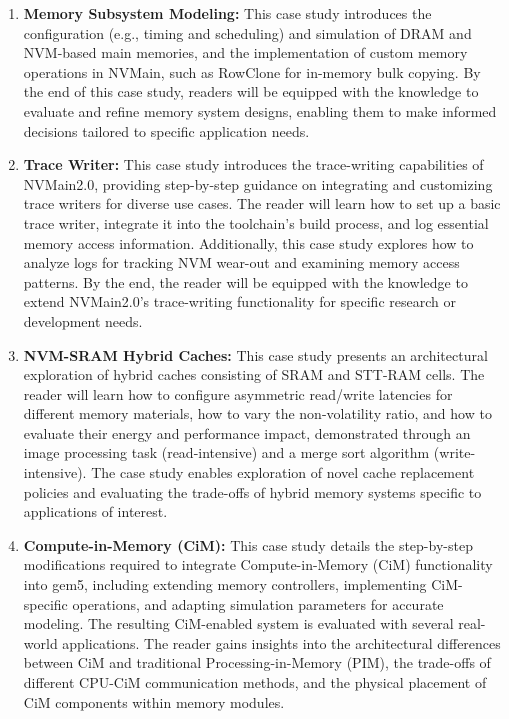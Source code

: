 \documentclass[manuscript,screen]{acmart}
\begin{document}
\begin{enumerate}
    \item \textbf{Memory Subsystem Modeling:} 
     This case study introduces the configuration (e.g., timing and scheduling) and simulation of DRAM and NVM-based main memories, and the implementation of custom memory operations in NVMain, such as RowClone for in-memory bulk copying.  By the end of this case study, readers will be equipped with the knowledge to evaluate and refine memory system designs, enabling them to make informed decisions tailored to specific application needs.

    \item \textbf{Trace Writer:}  This case study introduces the trace-writing capabilities of NVMain2.0, providing step-by-step guidance on integrating and customizing trace writers for diverse use cases. The reader will learn how to set up a basic trace writer, integrate it into the toolchain’s build process, and log essential memory access information. Additionally, this case study explores how to analyze logs for tracking NVM wear-out and examining memory access patterns. By the end, the reader will be equipped with the knowledge to extend NVMain2.0’s trace-writing functionality for specific research or development needs.
 
    \item \textbf{NVM-SRAM Hybrid Caches:} This case study presents an architectural exploration of hybrid caches consisting of SRAM and STT-RAM cells. The reader will learn how to configure asymmetric read/write latencies for different memory materials, how to vary the non-volatility ratio, and how to evaluate their energy and performance impact, demonstrated through an image processing task (read-intensive) and a merge sort algorithm (write-intensive). The case study enables exploration of novel cache replacement policies and evaluating the trade-offs of hybrid memory systems specific to applications of interest.
    
    \item \textbf{Compute-in-Memory (CiM):} 
    This case study details the step-by-step modifications required to integrate Compute-in-Memory (CiM) functionality into gem5, including extending memory controllers, implementing CiM-specific operations, and adapting simulation parameters for accurate modeling.
     The resulting CiM-enabled system is evaluated with several real-world applications.
    The reader gains insights into the architectural differences between CiM and traditional Processing-in-Memory (PIM), the trade-offs of different CPU-CiM communication methods, and the physical placement of CiM components within memory modules. 
    
    
\end{enumerate}
\end{document}
